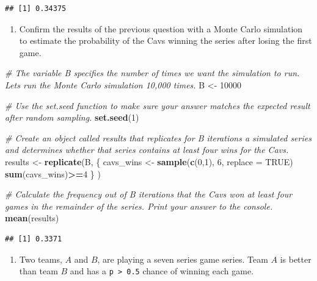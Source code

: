\documentclass[
]{article}
\newenvironment{Shaded}{\begin{snugshade}}{\end{snugshade}}
\newcommand{\CommentTok}[1]{\textcolor[rgb]{0.56,0.35,0.01}{\textit{#1}}}
\newcommand{\DataTypeTok}[1]{\textcolor[rgb]{0.13,0.29,0.53}{#1}}
\newcommand{\DecValTok}[1]{\textcolor[rgb]{0.00,0.00,0.81}{#1}}
\newcommand{\KeywordTok}[1]{\textcolor[rgb]{0.13,0.29,0.53}{\textbf{#1}}}
\newcommand{\NormalTok}[1]{#1}
\newcommand{\OperatorTok}[1]{\textcolor[rgb]{0.81,0.36,0.00}{\textbf{#1}}}
\newcommand{\OtherTok}[1]{\textcolor[rgb]{0.56,0.35,0.01}{#1}}
\newcommand{\StringTok}[1]{\textcolor[rgb]{0.31,0.60,0.02}{#1}}
\providecommand{\tightlist}{%
  \setlength{\itemsep}{0pt}\setlength{\parskip}{0pt}}
\begin{document}
\begin{verbatim}
## [1] 0.34375
\end{verbatim}

\begin{enumerate}
\def\labelenumi{\arabic{enumi}.}
\setcounter{enumi}{1}
\tightlist
\item
  Confirm the results of the previous question with a Monte Carlo
  simulation to estimate the probability of the Cavs winning the series
  after losing the first game.
\end{enumerate}

\begin{Shaded}
\begin{Highlighting}[]
\CommentTok{\# The variable \textasciigrave{}B\textasciigrave{} specifies the number of times we want the simulation to run. Let\textquotesingle{}s run the Monte Carlo simulation 10,000 times.}
\NormalTok{B \textless{}{-}}\StringTok{ }\DecValTok{10000}

\CommentTok{\# Use the \textasciigrave{}set.seed\textasciigrave{} function to make sure your answer matches the expected result after random sampling.}
\KeywordTok{set.seed}\NormalTok{(}\DecValTok{1}\NormalTok{)}

\CommentTok{\# Create an object called \textasciigrave{}results\textasciigrave{} that replicates for \textasciigrave{}B\textasciigrave{} iterations a simulated series and determines whether that series contains at least four wins for the Cavs.}
\NormalTok{results \textless{}{-}}\StringTok{ }\KeywordTok{replicate}\NormalTok{(B, \{ }
\NormalTok{  cavs\_wins \textless{}{-}}\StringTok{ }\KeywordTok{sample}\NormalTok{(}\KeywordTok{c}\NormalTok{(}\DecValTok{0}\NormalTok{,}\DecValTok{1}\NormalTok{), }\DecValTok{6}\NormalTok{, }\DataTypeTok{replace =} \OtherTok{TRUE}\NormalTok{)}
  \KeywordTok{sum}\NormalTok{(cavs\_wins)}\OperatorTok{\textgreater{}=}\DecValTok{4}\NormalTok{ \}}
\NormalTok{)}

\CommentTok{\# Calculate the frequency out of \textasciigrave{}B\textasciigrave{} iterations that the Cavs won at least four games in the remainder of the series. Print your answer to the console.}
\KeywordTok{mean}\NormalTok{(results)}
\end{Highlighting}
\end{Shaded}

\begin{verbatim}
## [1] 0.3371
\end{verbatim}

\begin{enumerate}
\def\labelenumi{\arabic{enumi}.}
\setcounter{enumi}{2}
\tightlist
\item
  Two teams, \(A\) and \(B\), are playing a seven series game series.
  Team \(A\) is better than team \(B\) and has a
  \texttt{p\ \textgreater{}\ 0.5} chance of winning each game.
\end{enumerate}
\end{document}
